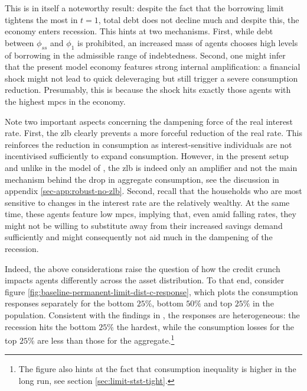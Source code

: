 \documentclass[12pt]{article} %
\numberwithin{equation}{section} %
\numberwithin{figure}{section}
\numberwithin{table}{section}
\begin{document}
This is in itself a noteworthy result: despite the fact that the borrowing limit tightens the most in $t=1$, total debt does not decline much and despite this, the economy enters recession. This hints at two mechanisms. First, while debt between $\phi_{ss}$ and $\phi_1$ is prohibited, an increased mass of agents chooses high levels of borrowing in the admissible range of indebtedness. Second, one might infer that the present model economy features strong internal amplification: a financial shock might not lead to quick deleveraging but still trigger a severe consumption reduction. Presumably, this is because the shock hits exactly those agents with the highest \Gls{mpc}s in the economy.

Note two important aspects concerning the dampening force of the real interest rate. First, the \Gls{zlb} clearly prevents a more forceful reduction of the real rate. This reinforces the reduction in consumption as interest-sensitive individuals are not incentivised sufficiently to expand consumption. However, in the present setup and unlike in the model of \textcite{egg2012}, the \Gls{zlb} is indeed only an amplifier and not the main mechanism behind the drop in aggregate consumption, see the discussion in appendix \ref{sec-app:robust-no-zlb}. Second, recall that the households who are most sensitive to changes in the interest rate are the relatively wealthy. At the same time, these agents feature low \Gls{mpc}s, implying that, even amid falling rates, they might not be willing to substitute away from their increased savings demand sufficiently and might consequently not aid much in the dampening of the recession. 

Indeed, the above considerations raise the question of how the credit crunch impacts agents differently across the asset distribution. To that end, consider figure \ref{fig:baseline-permanent-limit-dist-c-response}, which plots the consumption responses separately for the bottom $25\%$, bottom $50\%$ and top $25\%$ in the population. Consistent with the findings in \textcite{gl2017}, the responses are heterogeneous: the recession hits the bottom $25\%$ the hardest, while the consumption losses for the top $25\%$ are less than those for the aggregate.\footnote{The figure also hints at the fact that consumption inequality is higher in the long run, see section \ref{sec:limit-stst-tight}.} 
\end{document}
